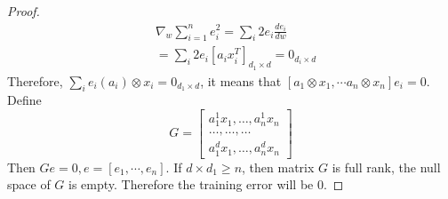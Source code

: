\documentclass[12pt]{report}
\begin{document}
\begin{proof}
\begin{equation}
	\begin{split}
	& \nabla_{w}\sum_{i = 1}^{n}e_i^2 = \sum_{i} 2e_i\frac{de_i}{dw} \\
	& = \sum_{i} 2e_i[a_ix_i^T]_{d_1\times d} = 0_{d_i \times d}
	\end{split}
	\end{equation}
	Therefore, $\sum_{i}e_i(a_i)\otimes x_i = 0_{d_1\times d}$, it means that
	$[a_1\otimes x_1, \cdots a_n \otimes x_n]e_i = 0$. Define 
	\[
	G = 
	\begin{bmatrix}
	a^1_1x_1, \dots, a^1_nx_n \\
	\dots, \dots, \dots \\
	a^d_1x_1, \dots, a^d_nx_n
	\end{bmatrix}
	\]
	Then $Ge = 0, e = [e_1, \cdots, e_n]$.
	If $d\times d_1 \geq n$, then matrix $G$ is full rank, the null space of $G$ is empty. Therefore the training error will be $0$.
\end{proof}


\end{document}
